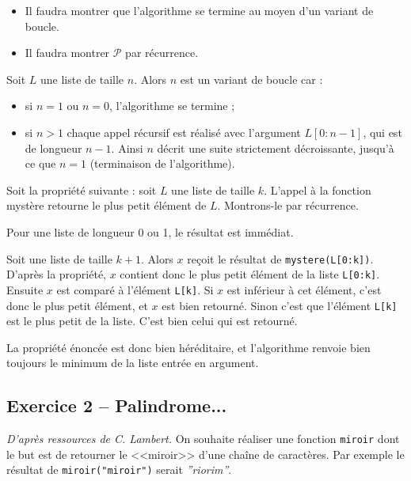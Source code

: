 \begin{rem}
\begin{itemize}
\item Il faudra montrer que l'algorithme se termine au moyen d'un variant de boucle. 
\item Il faudra montrer $\mathcal{P}$ par récurrence. 
\end{itemize}
\end{rem}
\ifprof
\begin{corrige}
Soit $L$ une liste de taille $n$. Alors $n$ est un variant de boucle car : 
\begin{itemize}
\item si $n=1$ ou $n=0$, l'algorithme se termine ;
\item si $n>1$ chaque appel récursif est réalisé avec l'argument $L[0:n-1]$, qui est de longueur $n-1$. Ainsi $n$ 
décrit une suite strictement décroissante, jusqu'à ce que $n=1$ (terminaison de l'algorithme). 
\end{itemize}

\vspace{.25cm}

Soit la propriété suivante : soit $L$ une liste de taille $k$. L'appel à la fonction mystère retourne le plus petit 
élément de $L$. Montrons-le par récurrence.

Pour une liste de longueur 0 ou 1, le résultat est immédiat.



Soit une liste de taille $k+1$.  Alors $x$ reçoit le résultat de \texttt{mystere(L[0:k])}. D'après la propriété, $x$ 
contient donc le plus petit élément de la liste \texttt{L[0:k]}. Ensuite $x$ est comparé à l'élément \texttt{L[k]}. Si 
$x$ est inférieur à cet élément, c'est donc le plus petit élément, et $x$ est bien retourné. Sinon c'est que l'élément 
\texttt{L[k]} est le plus petit de la liste. C'est bien celui qui est retourné. 

La propriété énoncée est donc bien héréditaire, et l'algorithme renvoie bien toujours le minimum de la liste entrée en 
argument.
\end{corrige}
\else
\fi

\subsection*{Exercice 2 -- Palindrome...}
\textit{D'après ressources de C. Lambert.}
\setcounter{subparagraph}{0}
On souhaite réaliser une fonction \texttt{miroir} dont le but est de retourner le <<miroir>> d'une chaîne de caractères. 
Par exemple le résultat de \texttt{miroir("miroir")} serait \textsl{''riorim''}.


